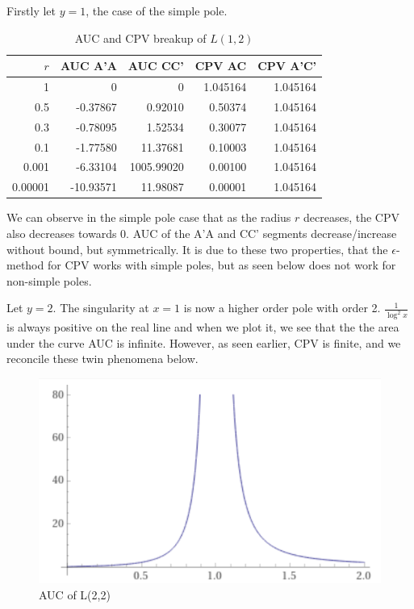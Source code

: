 \documentclass[a4paper,11pt,twoside]{amsart}
\begin{document}
Firstly let $y=1$, the case of the simple pole.

\begin{table}[H]
  \begin{center}
    \begin{tabular}{r|r|r|r|r} %
      $r$ & AUC A'A & AUC CC' & CPV AC & CPV A'C'\\
      \hline
      1 & 0 & 0 & 1.045164 & 1.045164\\
      0.5 & -0.37867 & 0.92010 & 0.50374 & 1.045164\\
      0.3 & -0.78095 & 1.52534 & 0.30077 & 1.045164\\
      0.1 & -1.77580 & 11.37681 & 0.10003 & 1.045164\\
      0.001 & -6.33104 & 1005.99020 & 0.00100 & 1.045164\\
      0.00001 & -10.93571 & 11.98087 & 0.00001 & 1.045164\\
    \end{tabular}
  \end{center}
  \caption{AUC and CPV breakup of $L(1,2)$}
\end{table}
\vspace{-2em}
We can observe in the simple pole case that as the radius $r$ decreases, the CPV also decreases towards 0. AUC of the A'A and CC' segments decrease/increase without bound, but symmetrically. It is due to these two properties, that the $\epsilon$-method for CPV works with simple poles, but as seen below does not work for non-simple poles.   

Let $y=2$. The singularity at $x=1$ is now a higher order pole with order 2. $\frac{1}{\log^{2}x}$ is always positive on the real line and when we plot it, we see that the the area under the curve AUC is infinite. However, as seen earlier, CPV is finite, and we reconcile these twin phenomena below. 

\begin{figure}[H]
  \includegraphics[width=0.5\linewidth]{l22_auc.png}
  \caption{AUC of L(2,2)}
\end{figure}
\end{document}
